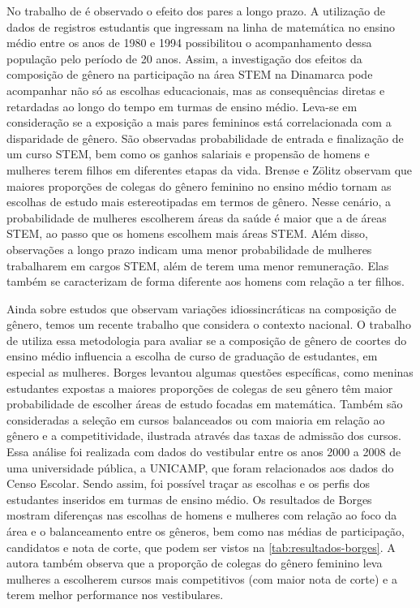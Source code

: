 No trabalho de \citet{Brene2020} é observado o efeito dos pares a longo prazo. A utilização de dados de registros estudantis que ingressam na linha de matemática no ensino médio entre os anos de 1980 e 1994 possibilitou o acompanhamento dessa população pelo período de 20 anos. Assim, a investigação dos efeitos da composição de gênero na participação na área STEM na Dinamarca pode acompanhar não só as escolhas educacionais, mas as consequências diretas e retardadas ao longo do tempo em turmas de ensino médio. Leva-se em consideração se a exposição a mais pares femininos está correlacionada com a disparidade de gênero. São observadas probabilidade de entrada e finalização de um curso STEM, bem como os ganhos salariais e propensão de homens e mulheres terem filhos em diferentes etapas da vida. Brenøe e Zölitz observam que maiores proporções de colegas do gênero feminino no ensino médio tornam as escolhas de estudo mais estereotipadas em termos de gênero. Nesse cenário, a probabilidade de mulheres escolherem áreas da saúde é maior que a de áreas STEM, ao passo que os homens escolhem mais áreas STEM. Além disso, observações a longo prazo indicam uma menor probabilidade de mulheres trabalharem em cargos STEM, além de terem uma menor remuneração. Elas também se caracterizam de forma diferente aos homens com relação a ter filhos.

Ainda sobre estudos que observam variações idiossincráticas na composição de gênero, temos um recente trabalho que considera o contexto nacional. O trabalho de \citet{Borges2021} utiliza essa metodologia para avaliar se a composição de gênero de coortes do ensino médio influencia a escolha de curso de graduação de estudantes, em especial as mulheres. Borges levantou algumas questões específicas, como meninas estudantes expostas a maiores proporções de colegas de seu gênero têm maior probabilidade de escolher áreas de estudo focadas em matemática. Também são consideradas a seleção em cursos balanceados ou com maioria em relação ao gênero e a competitividade, ilustrada através das taxas de admissão dos cursos. Essa análise foi realizada com dados do vestibular entre os anos 2000 a 2008 de uma universidade pública, a UNICAMP, que foram relacionados aos dados do Censo Escolar. Sendo assim, foi possível traçar as escolhas e os perfis dos estudantes inseridos em turmas de ensino médio. Os resultados de Borges mostram diferenças nas escolhas de homens e mulheres com relação ao foco da área e o balanceamento entre os gêneros, bem como nas médias de participação, candidatos e nota de corte, que podem ser vistos na \autoref{tab:resultados-borges}. A autora também observa que a proporção de colegas do gênero feminino leva mulheres a escolherem cursos mais competitivos (com maior nota de corte) e a terem melhor performance nos vestibulares. 

